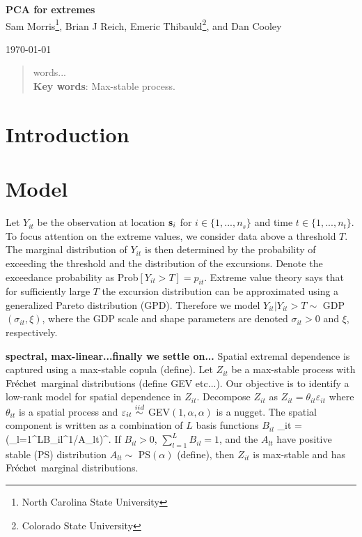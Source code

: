 \documentclass[11pt]{article}
\begin{document}
\linenumbers
\pagestyle{empty}
\begin{center}
{\Large {\bf PCA for extremes}}\\

{\large Sam Morris\footnote[1]{North Carolina State University}, Brian J Reich\footnotemark[1]{}, Emeric Thibauld\footnote[2]{Colorado State University}, and Dan Cooley\footnotemark[2]{}}

\today
\end{center}


\begin{abstract}
	words...\\
	{\bf Key words}: Max-stable process.

\end{abstract}
\newpage
\pagestyle{plain}
\setcounter{page}{1}

\section{Introduction}\label{s:intro}

\section{Model}\label{s:model}


Let $Y_{it}$ be the observation at location $\mbox{\bf s}_i$ for $i\in\{1,...,n_s\}$ and time $t\in\{1,...,n_t\}$.  To focus attention on the extreme values, we consider data above a threshold $T$.  The marginal distribution of $Y_{it}$ is then determined by the probability of exceeding the threshold and the distribution of the excursions. Denote the exceedance probability as Prob$[Y_{it}>T] = p_{it}$.  Extreme value theory says that for sufficiently large $T$ the excursion distribution can be approximated using a generalized Pareto distribution (GPD).  Therefore we model $Y_{it}|Y_{it}>T \sim$ GDP$(\sigma_{it},\xi)$, where the GDP  scale and shape parameters are denoted $\sigma_{it}>0$ and $\xi$, respectively.

{\bf spectral, max-linear...finally we settle on...} Spatial extremal dependence is captured using a max-stable copula (define).  Let $Z_{it}$ be a max-stable process with $\mbox{Fr$\acute{\mbox{e}}$chet}$ marginal distributions (define GEV etc...).  Our objective is to identify a low-rank model for spatial dependence in $Z_{it}$.  Decompose  $Z_{it}$ as $Z_{it}=\theta_{it}\varepsilon_{it}$ where $\theta_{it}$ is a spatial process and $\varepsilon_{it}\stackrel{iid}{\sim}$ GEV$(1,\alpha,\alpha)$ is a nugget.  The spatial component is written as a combination of $L$ basis functions $B_{il}$
\beq \label{theta}
  \theta_{it} = \left(\sum_{l=1}^LB_{il}^{1/\alpha}A_{lt}\right)^{\alpha}.
\eeq
If $B_{il}>0$, $\sum_{l=1}^LB_{il}=1$, and the $A_{lt}$ have positive stable (PS) distribution $A_{lt}\sim$ PS$(\alpha)$ (define), then $Z_{it}$ is max-stable and has $\mbox{Fr$\acute{\mbox{e}}$chet}$ marginal distributions.
\end{document}
